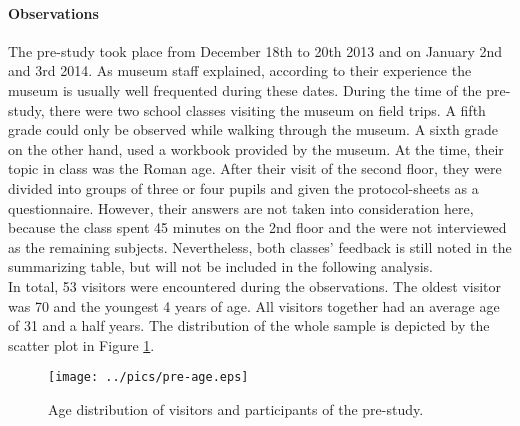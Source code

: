\paragraph{Observations} The pre-study took place from December 18th to 20th 2013 and on January 2nd and 3rd 2014. As museum staff explained, according to their experience the museum is usually well frequented during these dates. During the time of the pre-study, there were two school classes visiting the museum on field trips. A fifth grade could only be observed while walking through the museum. A sixth grade on the other hand, used a workbook provided by the museum. At the time, their topic in class was the Roman age. After their visit of the second floor, they were divided into groups of three or four pupils and given the protocol-sheets as a questionnaire. However, their answers are not taken into consideration here, because the class spent 45 minutes on the 2nd floor and the were not interviewed as the remaining subjects. Nevertheless, both classes' feedback is still noted in the summarizing table, but will not be included in the following analysis.
\\
In total, 53 visitors were encountered during the observations. The oldest visitor was 70 and the youngest 4 years of age. All visitors together had an average age of 31 and a half years. The distribution of the whole sample is depicted by the scatter plot in Figure \ref{fig:pre-study_ages}. 
\begin{figure}[H]%
\texttt{[image: ../pics/pre-age.eps]}%
\caption{Age distribution of visitors and participants of the pre-study.}
\label{fig:pre-study_ages} %
\end{figure}

